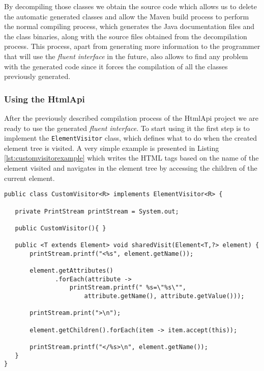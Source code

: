 \noindent
By decompiling those classes we obtain the source code which allows us to delete the automatic generated classes and allow the Maven build process to perform the normal compiling process, which generates the Java documentation files and the class binaries, along with the source files obtained from the decompilation process. This process, apart from generating more information to the programmer that will use the \textit{fluent interface} in the future, also allows to find any problem with the generated code since it forces the compilation of all the classes previously generated.

\subsubsection{Using the HtmlApi}

After the previously described compilation process of the HtmlApi project we are ready to use the generated \textit{fluent interface}. To start using it the first step is to implement the \texttt{ElementVisitor} class, which defines what to do when the created element tree is visited. A very simple example is presented in Listing \ref{lst:customvisitorexample} which writes the \ac{HTML} tags based on the name of the element visited and navigates in the element tree by accessing the children of the current element.

\bigskip


\begin{minipage}{\linewidth}
\begin{lstlisting}[caption={Custom Visitor Example that Implements the ElementVisitor Generated by XsdAsm},label={lst:customvisitorexample}]
public class CustomVisitor<R> implements ElementVisitor<R> {

   private PrintStream printStream = System.out;

   public CustomVisitor(){ }

   public <T extends Element> void sharedVisit(Element<T,?> element) {
       printStream.printf("<%s", element.getName());

       element.getAttributes()
              .forEach(attribute -> 
                  printStream.printf(" %s=\"%s\"", 
                      attribute.getName(), attribute.getValue()));

       printStream.print(">\n");

       element.getChildren().forEach(item -> item.accept(this));

       printStream.printf("</%s>\n", element.getName());
   }
}
\end{lstlisting}
\end{minipage}

